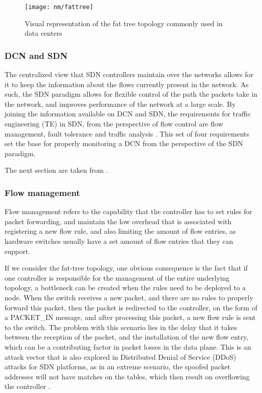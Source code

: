 \begin{figure} [!htbp]
    \centering
    \texttt{[image: nm/fattree]}
    \caption{Visual representation of the fat tree topology commonly used in data centers}
    \label{fig:fattree}
\end{figure}

\subsubsection {DCN and SDN}

\par The centralized view that SDN controllers maintain over the networks allows for it to keep the information about the flows currently present in the network. As
such, the SDN paradigm allows for flexible control of the path the packets take in the network, and improves performance of the network at a large
scale. By joining the information available on DCN and SDN, the requirements for traffic engineering (TE) in SDN, from the perspective of flow control are flow 
management, fault tolerance and traffic analysis \cite{akyildiz_research_2016}. This set of four requirements set the base for properly monitoring a DCN from the 
perspective of the SDN paradigm.
\par The next section are taken from \cite{akyildiz_research_2016}.

\subsubsection {Flow management}

Flow management refers to the capability that the controller has to set rules for packet forwarding, and maintain the low overhead that is associated with
registering a new flow rule, and also limiting the amount of flow entries, as hardware switches usually have a set amount of flow entries that they can support.

\par If we consider the fat-tree topology, one obvious consequence is the fact that if one controller is responsible for the management of the entire underlying 
topology, a bottleneck can be created when the rules need to be deployed to a node. When the switch receives a new packet, and there 
are no rules to properly forward this packet, then the packet is redirected to the controller, on the form of a \textsc{PACKET\_IN} message, and after processing
this packet, a new flow rule is sent to the switch. The problem with this scenario lies in the delay that it takes between the reception of the packet, and the
installation of the new flow entry, which can be a contributing factor in packet losses in the data plane. This is an attack vector that is also explored in
Distributed Denial of Service (DDoS) attacks for SDN platforms, as in an extreme scenario, the spoofed packet addresses will not have matches on the tables, which
then result on overflowing the controller \cite{mousavi_early_2015}.

